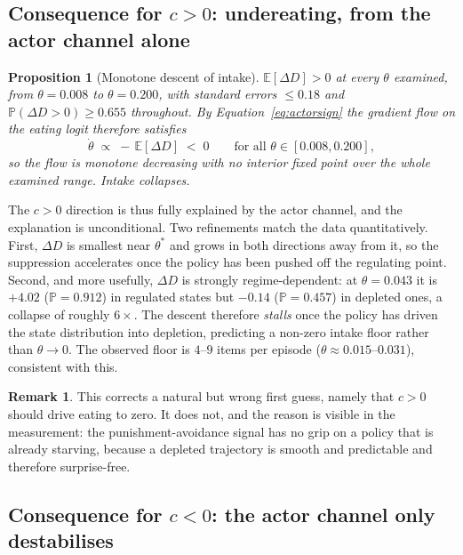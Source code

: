 \documentclass[11pt]{article}
\newtheorem{proposition}[theorem]{Proposition}
\theoremstyle{definition}
\newtheorem{remark}[theorem]{Remark}
\newcommand{\E}{\mathbb{E}}
\newcommand{\Prob}{\mathbb{P}}
\begin{document}
\subsection{Consequence for $c>0$: undereating, from the actor channel alone}

\begin{proposition}[Monotone descent of intake]
\label{prop:pos}
$\E[\Delta D]>0$ at every $\theta$ examined, from $\theta=0.008$ to
$\theta=0.200$, with standard errors $\le0.18$ and
$\Prob(\Delta D>0)\ge0.655$ throughout. By Equation~\eqref{eq:actorsign} the
gradient flow on the eating logit therefore satisfies
\begin{equation}
\dot\theta\;\propto\;-\,\E[\Delta D]\;<\;0
\qquad\text{for all }\theta\in[0.008,0.200],
\label{eq:posflow}
\end{equation}
so the flow is monotone decreasing with no interior fixed point over the whole
examined range. Intake collapses.
\end{proposition}

\noindent
The $c>0$ direction is thus fully explained by the actor channel, and the
explanation is unconditional. Two refinements match the data quantitatively.
First, $\Delta D$ is smallest near $\theta^\ast$ and grows in both directions
away from it, so the suppression accelerates once the policy has been pushed
off the regulating point. Second, and more usefully, $\Delta D$ is strongly
regime-dependent: at $\theta=0.043$ it is $+4.02$ ($\Prob=0.912$) in regulated
states but $-0.14$ ($\Prob=0.457$) in depleted ones, a collapse of roughly
$6\times$. The descent therefore \emph{stalls} once the policy has driven the
state distribution into depletion, predicting a non-zero intake floor rather
than $\theta\to0$. The observed floor is $4$--$9$ items per episode
($\theta\approx0.015$--$0.031$), consistent with this.

\begin{remark}
This corrects a natural but wrong first guess, namely that $c>0$ should drive
eating to zero. It does not, and the reason is visible in the measurement: the
punishment-avoidance signal has no grip on a policy that is already starving,
because a depleted trajectory is smooth and predictable and therefore
surprise-free.
\end{remark}

\subsection{Consequence for $c<0$: the actor channel only destabilises}
\end{document}
